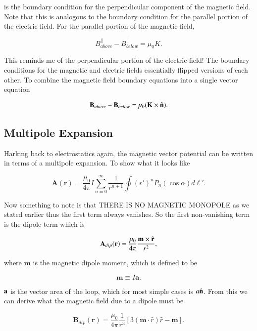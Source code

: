 \documentclass[preprint, review,12pt]{elsarticle}
\def\m{\frac{\mu_0}{4\pi}}
\def\x{\times}
\def\.{\cdot}
\def\b{\textbf}
\def\bell{\bm{\ell}}
\def\={\equiv}
\newcommand{\hb}[1]{\hat{\b #1}}
\begin{document}
is the boundary condition for the perpendicular component of the magnetic field. Note that this is analogous to the boundary condition for the parallel portion of the electric field. For the parallel portion of the magnetic field,

\begin{equation}
    B_{above}^\parallel - B_{below}^\parallel = \mu_0 K.
\end{equation}

This reminds me of the perpendicular portion of the electric field! The boundary conditions for the magnetic and electric fields essentially flipped versions of each other. To combine the magnetic field boundary equations into a single vector equation

\begin{equation}
    \b{B}_{above} - \b{B}_{below}= \mu_0 (\b{K} \x \hb{n}).
\end{equation}

\subsection{Multipole Expansion}

Harking back to electrostatics again, the magnetic vector potential can be written in terms of a multipole expansion. To show what it looks like

\begin{equation}
    \b{A}(\b{r}) = \m I \sum_{n=0}^\infty \frac{1}{r^{n+1}}\oint (r')^n  P_n(\cos\alpha) d\bell '.
\end{equation}

Now something to note is that THERE IS NO MAGNETIC MONOPOLE as we stated earlier thus the first term always vanishes. So the first non-vanishing term is the dipole term which is

\begin{equation}
    \b{A}_{dip}(\b{r}) = \m \frac{\b{m} \x \hb{r}}{r^2},
\end{equation}

where $\b{m}$ is the magnetic dipole moment, which is defined to be

\begin{equation}
    \b{m} \= I\b{a}.
\end{equation}

$\b a$ is the vector area of the loop, which for most simple cases is $a\hb{n}$. From this we can derive what the magnetic field due to a dipole must be

\begin{equation}
    \b{B}_{dip}(\b{r}) = \m \frac{1}{r^3}[3(\b{m} \. \hat{r})\hat{r} - \b{m}].
\end{equation}
\end{document}
